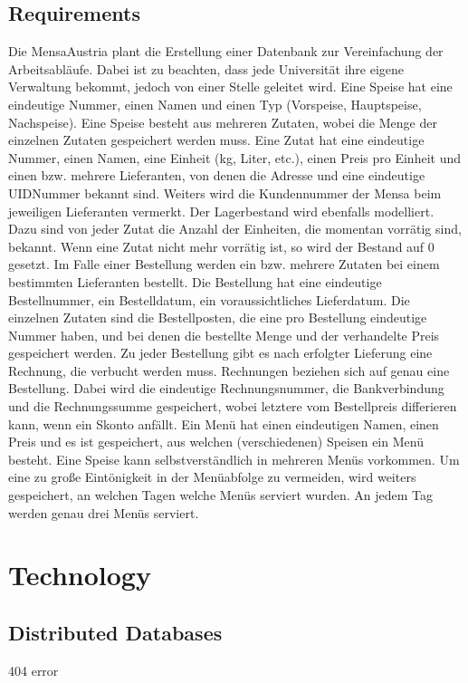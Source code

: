\documentclass[11pt,a4paper]{article}
\begin{document}
\subsection{Requirements}
Die MensaAustria plant die Erstellung einer Datenbank zur Vereinfachung der Arbeitsabläufe. Dabei
ist zu beachten, dass jede Universität ihre eigene Verwaltung bekommt, jedoch von einer Stelle
geleitet wird.
Eine Speise hat eine eindeutige Nummer, einen Namen und einen Typ (Vorspeise, Hauptspeise,
Nachspeise). Eine Speise besteht aus mehreren Zutaten, wobei die Menge der einzelnen Zutaten
gespeichert werden muss.
Eine Zutat hat eine eindeutige Nummer, einen Namen, eine Einheit (kg, Liter, etc.), einen Preis pro
Einheit und einen bzw. mehrere Lieferanten, von denen die Adresse und eine eindeutige
UIDNummer bekannt sind. Weiters wird die Kundennummer der Mensa beim jeweiligen Lieferanten
vermerkt. Der Lagerbestand wird ebenfalls modelliert. Dazu sind von jeder Zutat die Anzahl der
Einheiten, die momentan vorrätig sind, bekannt. Wenn eine Zutat nicht mehr vorrätig ist, so wird der
Bestand auf 0 gesetzt.
Im Falle einer Bestellung werden ein bzw. mehrere Zutaten bei einem bestimmten Lieferanten
bestellt. Die Bestellung hat eine eindeutige Bestellnummer, ein Bestelldatum, ein voraussichtliches
Lieferdatum. Die einzelnen Zutaten sind die Bestellposten, die eine pro Bestellung eindeutige
Nummer haben, und bei denen die bestellte Menge und der verhandelte Preis gespeichert werden.
Zu jeder Bestellung gibt es nach erfolgter Lieferung eine Rechnung, die verbucht werden muss.
Rechnungen beziehen sich auf genau eine Bestellung. Dabei wird die eindeutige Rechnungsnummer,
die Bankverbindung und die Rechnungssumme gespeichert, wobei letztere vom Bestellpreis
differieren kann, wenn ein Skonto anfällt.
Ein Menü hat einen eindeutigen Namen, einen Preis und es ist gespeichert, aus welchen
(verschiedenen) Speisen ein Menü besteht. Eine Speise kann selbstverständlich in mehreren Menüs
vorkommen.
Um eine zu große Eintönigkeit in der Menüabfolge zu vermeiden, wird weiters gespeichert, an
welchen Tagen welche Menüs serviert wurden. An jedem Tag werden genau drei Menüs serviert.

\newpage
\section{Technology}
\subsection{Distributed Databases}
404 error
\end{document}

